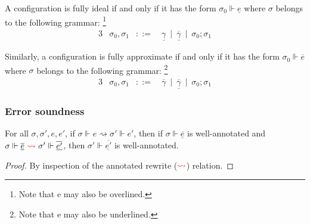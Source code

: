 \begin{definition}
  A configuration is fully ideal if and only if it has the form
  $\sigma_0 \Vdash \underline{e}$ where $\sigma$ belongs to the following grammar:
  \footnote{Note that e may also be overlined.}
      \begin{alignat*}{3}
        &\sigma_0, \sigma_1 &::=~ & \underline{\gamma}
            \ \mid \ \underline{\overline{\gamma}} \ \mid \ \sigma_0; \sigma_1
      \end{alignat*}

\end{definition}

\begin{definition}
  Similarly, a configuration is fully approximate if and only if it has the form
  $\sigma_0 \Vdash \overline{e}$ where $\sigma$ belongs to the following
  grammar:
  \footnote{Note that e may also be underlined.}
      \begin{alignat*}{3}
        &\sigma_0, \sigma_1 &::=~ & \overline{\gamma}
            \ \mid \ \underline{\overline{\gamma}} \ \mid \ \sigma_0; \sigma_1
      \end{alignat*}
\end{definition}

\subsubsection{Error soundness}
\begin{lemma}\label{thm:expressions-preserve-annotations} 
  For all $\sigma, \sigma', e, e'$, if $\sigma \Vdash e \rightsquigarrow \sigma'
  \Vdash e'$, then if $\sigma \Vdash \underline{\overline{e}}$ is well-annotated
  and $\sigma \Vdash \underline{\overline{e}} \
  \textcolor{red}{\rightsquigarrow} \ \sigma' \Vdash \underline{\overline{e'}}$,
  then $\sigma' \Vdash \underline{\overline{e'}}$ is well-annotated.
\end{lemma}
\begin{proof}
  By inspection of the annotated rewrite ($\textcolor{red}{\rightsquigarrow}$) relation.
\end{proof}

